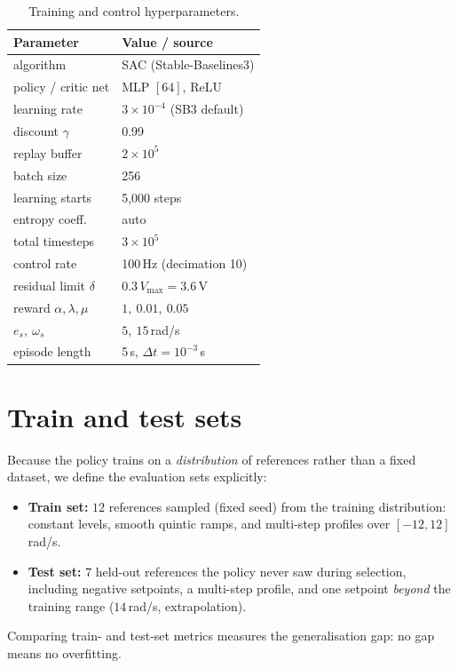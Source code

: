 \documentclass[10pt,twocolumn]{article}
\begin{document}
\begin{table}[h]
\centering
\caption{Training and control hyperparameters.}
\label{tab:hyper}
\small
\begin{tabular}{ll}
\toprule
\textbf{Parameter} & \textbf{Value / source}\\
\midrule
algorithm            & SAC (Stable-Baselines3)\\
policy / critic net  & MLP $[64]$, ReLU\\
learning rate        & $3\times10^{-4}$ (SB3 default)\\
discount $\gamma$    & 0.99\\
replay buffer        & $2\times10^{5}$\\
batch size           & 256\\
learning starts      & 5{,}000 steps\\
entropy coeff.       & auto\\
total timesteps      & $3\times10^{5}$\\
control rate         & 100\,Hz (decimation 10)\\
residual limit $\delta$ & $0.3\,V_{\max}=3.6$\,V\\
reward $\alpha,\lambda,\mu$ & $1,\ 0.01,\ 0.05$\\
$e_s,\ \omega_s$     & $5,\ 15$\,rad/s\\
episode length       & 5\,s, $\Delta t=10^{-3}$\,s\\
\bottomrule
\end{tabular}
\end{table}

\section{Train and test sets}
Because the policy trains on a \emph{distribution} of references rather
than a fixed dataset, we define the evaluation sets explicitly:
\begin{itemize}\setlength\itemsep{1pt}
\item \textbf{Train set:} $12$ references sampled (fixed seed) from
the training distribution: constant levels, smooth quintic ramps, and
multi-step profiles over $[-12,12]$\,rad/s.
\item \textbf{Test set:} $7$ held-out references the policy never saw
during selection, including negative setpoints, a multi-step profile,
and one setpoint \emph{beyond} the training range ($14$\,rad/s,
extrapolation).
\end{itemize}
Comparing train- and test-set metrics measures the generalisation gap:
no gap means no overfitting.
\end{document}

